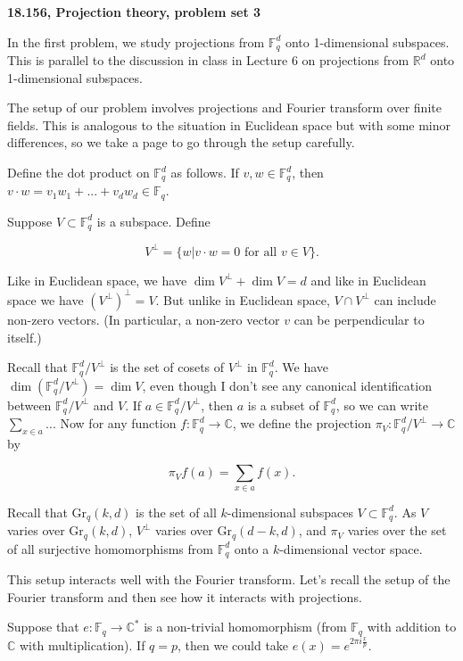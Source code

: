 \documentclass{amsart}
\newcommand{\FF}{\mathbb{F}}
\newcommand{\CC}{\mathbb{C}}
\newcommand{\RR}{\mathbb{R}}
\newcommand{\Gr}{\textrm{Gr}}
\begin{document}
{\bf  18.156, Projection theory,  problem set 3}

\vskip10pt

 In the first problem,  we study projections from $\FF_q^d$ onto 1-dimensional subspaces.   This is parallel to the discussion in class in Lecture 6 on projections from $\RR^d$ onto 1-dimensional subspaces.
 
 \vskip10pt
 
The setup of our problem involves projections and Fourier transform over finite fields.   This is analogous to the situation in Euclidean space but with some minor differences,  so we take a page to go through the setup carefully.

Define the dot product on $\FF_q^d$ as follows.   If $v,w \in \FF_q^d$,  then $v \cdot w = v_1 w_1 + ... + v_d w_d \in \FF_q$.  

Suppose $V \subset \FF_q^d$ is a subspace.  Define

$$ V^\perp = \{ w |  v \cdot w = 0 \textrm{ for all } v \in V \}.$$

Like in Euclidean space,  we have $\dim V^\perp + \dim V = d$ and like in Euclidean space we have $(V^\perp)^\perp = V$.  But unlike in Euclidean space,  $V \cap V^\perp$ can include non-zero vectors.  (In particular,  a non-zero vector $v$ can be perpendicular to itself.)

Recall that $\FF_q^d / V^\perp$ is the set of cosets of $V^\perp$ in $\FF_q^d$.   We have $\dim ( \FF_q^d / V^\perp) = \dim V$,  even though I don't see any canonical identification between $\FF_q^d / V^\perp$ and $V$.   If $a \in \FF_q^d / V^\perp$,  then $a$ is a subset of $\FF_q^d$,  so we can write $\sum_{x \in a} ...$  Now for any function $f: \FF_q^d \rightarrow \CC$, we define the projection $\pi_V: \FF_q^d / V^\perp \rightarrow \CC$ by 

$$ \pi_V f(a) = \sum_{x \in a} f(x). $$

Recall that $\Gr_q(k,d)$ is the set of all $k$-dimensional subspaces $V \subset \FF_q^d$.   As $V$ varies over $\Gr_q(k,d)$,  $V^\perp$ varies over $\Gr_q(d-k, d)$, and $\pi_V$ varies over the set of all surjective homomorphisms from $\FF_q^d$ onto a $k$-dimensional vector space.

This setup interacts well with the Fourier transform.   Let's recall the setup of the Fourier transform and then see how it interacts with projections.  

Suppose that $e: \FF_q \rightarrow \CC^*$ is a non-trivial homomorphism (from $\FF_q$ with addition to $\CC$ with multiplication).   If $q=p$, then we could take $e(x) = e^{2 \pi i \frac{x}{p}}$.   
\end{document}
